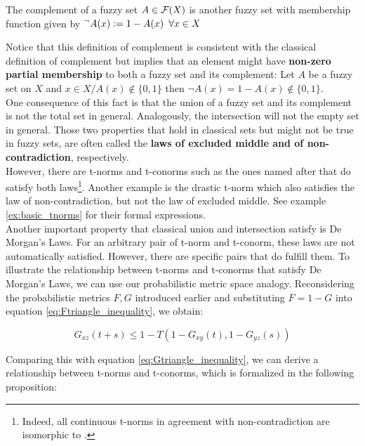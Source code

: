 \begin{definition}[Complement]
  The complement of a fuzzy set $A\in \mathcal{F}(X)$ is another fuzzy set with membership function given by $^\lnot A(x) \coleq 1 - A(x) \forall x\in X$
\end{definition}

Notice that this definition of complement is consistent with the classical definition of complement but implies that an element might have \textbf{non-zero partial membership} to both a fuzzy set and its complement: Let $A$ be a fuzzy set on $X$ and $x \in X / A(x)\notin \{0,1\}$ then $\lnot A(x)= 1 - A(x) \notin \{0,1\}$.\\

One consequence of this fact is that the union of a fuzzy set and its complement is not the total set in general. Analogously, the intersection will not the empty set in general. Those two properties that hold in classical sets but might not be true in fuzzy sets, are often called the \textbf{laws of excluded middle and of non-contradiction}, respectively.\\

However, there are t-norms and t-conorms such as the ones named after \luka that do satisfy both laws\footnote{Indeed, all continuous t-norms in agreement with non-contradiction are isomorphic to \luka \cite[p.~7]{LukasiewiczNonContrad}.}. Another example is the drastic t-norm which also satisfies the law of non-contradiction, but not the law of excluded middle. See example \ref{ex:basic_tnorms} for their formal expressions. \\

Another important property that classical union and intersection satisfy is De Morgan's Laws. For an arbitrary pair of t-norm and t-conorm, these laws are not automatically satisfied. However, there are specific pairs that do fulfill them. To illustrate the relationship between t-norms and t-conorms that satisfy De Morgan's Laws, we can use our probabilistic metric space analogy. Reconsidering the probabilistic metrics $F,G$ introduced earlier and substituting $F = 1 - G$ into equation \ref{eq:Ftriangle_inequality}, we obtain:

\[ G_{xz}(t + s) \leq 1 - T(1 - G_{xy}(t), 1 - G_{yz}(s))\]

Comparing this with equation \ref{eq:Gtriangle_inequality}, we can derive a relationship between t-norms and t-conorms, which is formalized in the following proposition:

